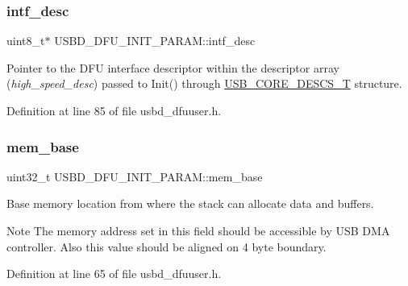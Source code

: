 \subsubsection{\texorpdfstring{intf\+\_\+desc}{intf\_desc}}
{\footnotesize\ttfamily uint8\+\_\+t$\ast$ U\+S\+B\+D\+\_\+\+D\+F\+U\+\_\+\+I\+N\+I\+T\+\_\+\+P\+A\+R\+A\+M\+::intf\+\_\+desc}

Pointer to the D\+FU interface descriptor within the descriptor array ({\itshape high\+\_\+speed\+\_\+desc}) passed to Init() through \hyperlink{group___u_s_b_d___core_gabdc617d119eac0555f91bea957c41ecc}{U\+S\+B\+\_\+\+C\+O\+R\+E\+\_\+\+D\+E\+S\+C\+S\+\_\+T} structure. 

Definition at line 85 of file usbd\+\_\+dfuuser.\+h.

\mbox{\label{struct_u_s_b_d___d_f_u___i_n_i_t___p_a_r_a_m_a00d172e271b0f2272b052f479c3d2439}} 
\subsubsection{\texorpdfstring{mem\+\_\+base}{mem\_base}}
{\footnotesize\ttfamily uint32\+\_\+t U\+S\+B\+D\+\_\+\+D\+F\+U\+\_\+\+I\+N\+I\+T\+\_\+\+P\+A\+R\+A\+M\+::mem\+\_\+base}

Base memory location from where the stack can allocate data and buffers. \begin{DoxyNote}{Note}
The memory address set in this field should be accessible by U\+SB D\+MA controller. Also this value should be aligned on 4 byte boundary. 
\end{DoxyNote}


Definition at line 65 of file usbd\+\_\+dfuuser.\+h.

\mbox{\label{struct_u_s_b_d___d_f_u___i_n_i_t___p_a_r_a_m_a4624ef53dbdf39e27314fa7b19d6720d}} 
